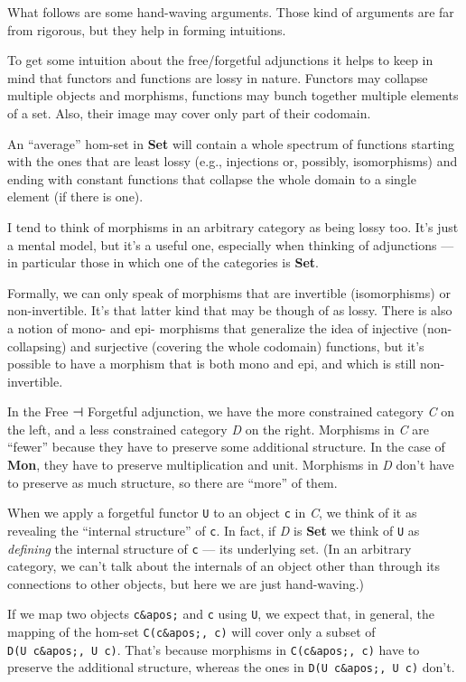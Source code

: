What follows are some hand-waving arguments. Those kind of arguments are
far from rigorous, but they help in forming intuitions.

To get some intuition about the free/forgetful adjunctions it helps to
keep in mind that functors and functions are lossy in nature. Functors
may collapse multiple objects and morphisms, functions may bunch
together multiple elements of a set. Also, their image may cover only
part of their codomain.

An ``average'' hom-set in \textbf{Set} will contain a whole spectrum of
functions starting with the ones that are least lossy (e.g., injections
or, possibly, isomorphisms) and ending with constant functions that
collapse the whole domain to a single element (if there is one).

I tend to think of morphisms in an arbitrary category as being lossy
too. It's just a mental model, but it's a useful one, especially when
thinking of adjunctions --- in particular those in which one of the
categories is \textbf{Set}.

Formally, we can only speak of morphisms that are invertible
(isomorphisms) or non-invertible. It's that latter kind that may be
though of as lossy. There is also a notion of mono- and epi- morphisms
that generalize the idea of injective (non-collapsing) and surjective
(covering the whole codomain) functions, but it's possible to have a
morphism that is both mono and epi, and which is still non-invertible.

In the Free ⊣ Forgetful adjunction, we have the more constrained
category \emph{C} on the left, and a less constrained category \emph{D}
on the right. Morphisms in \emph{C} are ``fewer'' because they have to
preserve some additional structure. In the case of \textbf{Mon}, they
have to preserve multiplication and unit. Morphisms in \emph{D} don't
have to preserve as much structure, so there are ``more'' of them.

When we apply a forgetful functor \texttt{U} to an object \texttt{c} in
\emph{C}, we think of it as revealing the ``internal structure'' of
\texttt{c}. In fact, if \emph{D} is \textbf{Set} we think of \texttt{U}
as \emph{defining} the internal structure of \texttt{c} --- its
underlying set. (In an arbitrary category, we can't talk about the
internals of an object other than through its connections to other
objects, but here we are just hand-waving.)

If we map two objects \texttt{c\&apos;} and \texttt{c} using \texttt{U},
we expect that, in general, the mapping of the hom-set
\texttt{C(c\&apos;,\ c)} will cover only a subset of
\texttt{D(U\ c\&apos;,\ U\ c)}. That's because morphisms in
\texttt{C(c\&apos;,\ c)} have to preserve the additional structure,
whereas the ones in \texttt{D(U\ c\&apos;,\ U\ c)} don't.

